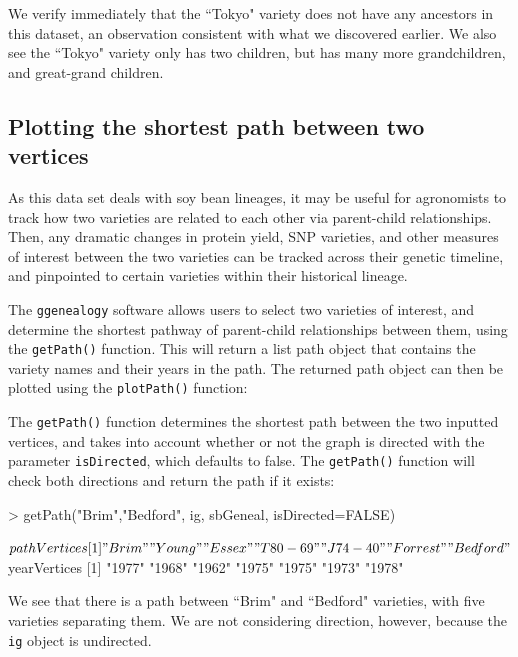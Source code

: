 \documentclass{article}
\numberwithin{equation}{section} %
\newcommand{\pkg}[1]{{\texttt{#1}}}
\begin{document}
We verify immediately that the ``Tokyo" variety does not have any ancestors in this dataset, an observation consistent with what we discovered earlier. We also see the ``Tokyo" variety only has two children, but has many more grandchildren, and great-grand children.

\subsection{Plotting the shortest path between two vertices}

As this data set deals with soy bean lineages, it may be useful for agronomists to track how two varieties are related to each other via parent-child relationships. Then, any dramatic changes in protein yield, SNP varieties, and other measures of interest between the two varieties can be tracked across their genetic timeline, and pinpointed to certain varieties within their historical lineage.

The \pkg{ggenealogy} software allows users to select two varieties of interest, and determine the shortest pathway of parent-child relationships between them, using the \texttt{getPath()} function. This will return a list path object that contains the variety names and their years in the path. The returned path object can then be plotted using the \texttt{plotPath()} function:

The \texttt{getPath()} function determines the shortest path between the two inputted vertices, and takes into account whether or not the graph is directed with the parameter \texttt{isDirected}, which defaults to false. The \texttt{getPath()} function will check both directions and return the path if it exists:

\begin{Schunk}
\begin{Sinput}
> getPath("Brim","Bedford", ig, sbGeneal, isDirected=FALSE)
\end{Sinput}
\begin{Soutput}
$pathVertices
[1] "Brim"    "Young"   "Essex"   "T80-69"  "J74-40"  "Forrest" "Bedford"

$yearVertices
[1] "1977" "1968" "1962" "1975" "1975" "1973" "1978"
\end{Soutput}
\end{Schunk}

We see that there is a path between ``Brim" and ``Bedford" varieties, with five varieties separating them. We are not considering direction, however, because the \texttt{ig} object is undirected.
\end{document}
